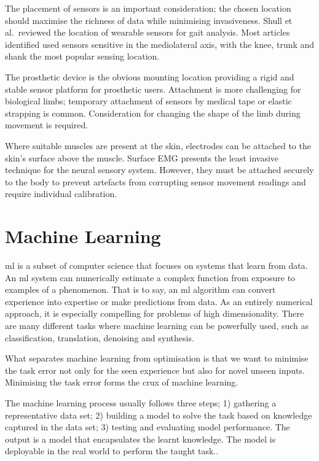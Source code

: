 The placement of sensors is an important consideration; the chosen location should maximise the richness of data while minimising invasiveness\cite{Tucker2015}. Shull et al.~reviewed the location of wearable sensors for gait analysis. Most articles identified used sensors sensitive in the mediolateral axis, with the knee, trunk and shank the most popular sensing location.\cite{Shull2014}

The prosthetic device is the obvious mounting location providing a rigid and stable sensor platform for prosthetic users. Attachment is more challenging for biological limbs; temporary attachment of sensors by medical tape or elastic strapping is common. Consideration for changing the shape of the limb during movement is required.

Where suitable muscles are present at the skin, electrodes can be attached to the skin's surface above the muscle. Surface EMG presents the least invasive technique for the neural sensory system. However, they must be attached securely to the body to prevent artefacts from corrupting sensor movement readings and require individual calibration.


\section{Machine Learning}
\label{sec:background-machine-learning}
\acrfull{ml} is a subset of computer science that focuses on systems that learn from data. An \acrshort{ml} system can numerically estimate a complex function from exposure to examples of a phenomenon. That is to say, an \acrshort{ml} algorithm can convert experience into expertise or make predictions from data. As an entirely numerical approach, it is especially compelling for problems of high dimensionality. There are many different tasks where machine learning can be powerfully used, such as classification, translation, denoising and synthesis.\cite{Mitchell1997, Shalev-Shwartz2014, Goodfellow2015, Burkov2019}

What separates machine learning from optimisation is that we want to minimise the task error not only for the seen experience but also for novel unseen inputs. Minimising the task error forms the crux of machine learning.\cite{Goodfellow2015}

The machine learning process usually follows three steps; 1) gathering a representative data set; 2) building a model to solve the task based on knowledge captured in the data set; 3) testing and evaluating model performance\cite{Burkov2019}. The output is a model that encapsulates the learnt knowledge. The model is deployable in the real world to perform the taught task.\cite{Shalev-Shwartz2014}.

